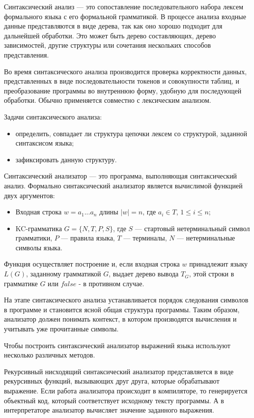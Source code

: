 \documentclass[bachelor, och, coursework, times]{SCWorks}
\begin{document}
Синтаксический анализ --- это сопоставление последовательного набора лексем формального языка с его формальной грамматикой.
В процессе анализа входные данные представляются в виде дерева, так как оно хорошо подходит для дальнейшей обработки. Это может быть дерево составляющих, дерево зависимостей, другие структуры или сочетания нескольких способов представления.

Во время синтаксического анализа производится проверка корректности данных, представленных в виде последовательности токенов и совокупности таблиц, и преобразование программы во внутреннюю форму, удобную для последующей обработки. Обычно применяется совместно с лексическим анализом.

Задачи синтаксического анализа:
\begin{itemize}
\item определить, совпадает ли структура цепочки лексем со структурой, заданной синтаксисом языка;
\item зафиксировать данную структуру.
\end{itemize}

Синтаксический анализатор --- это программа, выполняющая синтаксический анализ.
Формально синтаксический анализатор является вычислимой функцией двух аргументов:
\begin{itemize}
\item Входная строка $w = a_1...a_n$ длины $|w| = n$, где $a_i \in T$, $1 \leqslant i \leqslant n$;
\item KC-грамматика $G = \{N, T, P, S\}$, где $S$ --- стартовый нетерминальный символ грамматики, $P$ --- правила языка, $T$ --- терминалы, $N$ --- нетерминальные символы языка.
\end{itemize}

Функция осуществляет построение и, если входная строка $w$ принадлежит языку $L(G)$, заданному грамматикой $G$, выдает дерево вывода $T_G$, этой строки в грамматике $G$ или $false$ - в противном случае.

На этапе синтаксического анализа устанавливается порядок следования символов в программе и становится ясной общая структура программы. Таким образом, анализатор должен понимать контекст, в котором производятся вычисления и учитывать уже прочитанные символы.

Чтобы построить синтаксический анализатор выражений языка используют несколько различных методов.

Рекурсивный нисходящий синтаксический анализатор представляется в виде рекурсивных функций, вызывающих друг друга, которые обрабатывают выражение. Если работа анализатора происходит в компиляторе, то генерируется объектный код, который соответствует исходному тексту программы.
А в интерпретаторе анализатор вычисляет значение заданного выражения.
\end{document}
